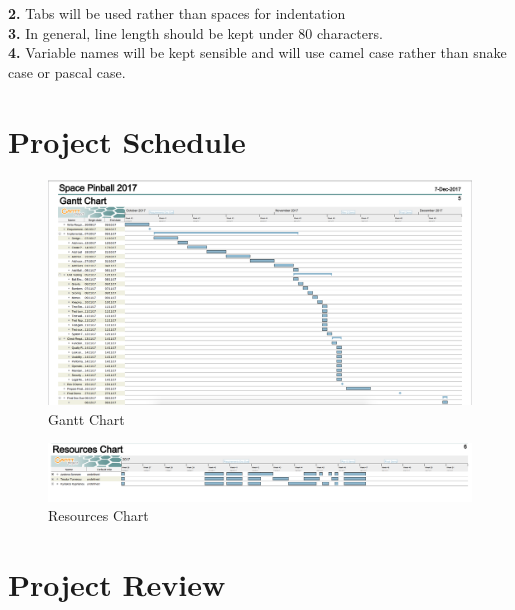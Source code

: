 \documentclass{article}
\begin{document}
\textbf{2.} Tabs will be used rather than spaces for indentation\\

\textbf{3.} In general, line length should be kept under 80 characters. \\

\textbf{4.} Variable names will be kept sensible and will use camel case rather than snake case or pascal case. 
\newpage

\section{Project Schedule}


\begin{figure}[h]
  \includegraphics[scale=0.17]{gan.png}
  \caption{Gantt Chart}
  \label{fig:Gantt Chart}
\end{figure}

\begin{figure}[h]
  \includegraphics[scale=0.4]{res.png}
  \caption{Resources Chart}
  \label{fig:Resources Chart}
\end{figure}


\section{Project Review}
\end{document}
